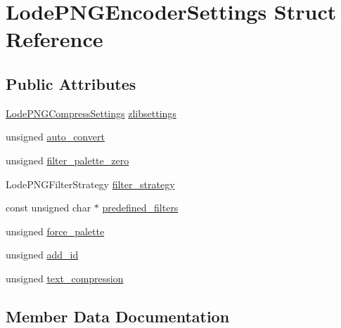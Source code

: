 \hypertarget{struct_lode_p_n_g_encoder_settings}{}\section{Lode\+P\+N\+G\+Encoder\+Settings Struct Reference}
\label{struct_lode_p_n_g_encoder_settings}
\subsection*{Public Attributes}
\begin{DoxyCompactItemize}
\item 
\mbox{\hyperlink{struct_lode_p_n_g_compress_settings}{Lode\+P\+N\+G\+Compress\+Settings}} \mbox{\hyperlink{struct_lode_p_n_g_encoder_settings_a2c5928b4172c75e27de467870f2ff946}{zlibsettings}}
\item 
unsigned \mbox{\hyperlink{struct_lode_p_n_g_encoder_settings_a1203b8db6532c9ff4a5c8ee692cd327a}{auto\+\_\+convert}}
\item 
unsigned \mbox{\hyperlink{struct_lode_p_n_g_encoder_settings_a0d82e8f2fabcb6cebbc54b80922945f1}{filter\+\_\+palette\+\_\+zero}}
\item 
Lode\+P\+N\+G\+Filter\+Strategy \mbox{\hyperlink{struct_lode_p_n_g_encoder_settings_a5e18e4eb941763a2e3e6c65ee9f0729c}{filter\+\_\+strategy}}
\item 
const unsigned char $\ast$ \mbox{\hyperlink{struct_lode_p_n_g_encoder_settings_a4446f87b5283f25664802a1be037e76e}{predefined\+\_\+filters}}
\item 
unsigned \mbox{\hyperlink{struct_lode_p_n_g_encoder_settings_a04dc9622ccd1d7c74c56291409aa512a}{force\+\_\+palette}}
\item 
unsigned \mbox{\hyperlink{struct_lode_p_n_g_encoder_settings_a893aa542aa7c122c32ee36dd716fbcb2}{add\+\_\+id}}
\item 
unsigned \mbox{\hyperlink{struct_lode_p_n_g_encoder_settings_a6ffdcb8e85a65ea208fe027be072d710}{text\+\_\+compression}}
\end{DoxyCompactItemize}


\subsection{Member Data Documentation}
\mbox{\label{struct_lode_p_n_g_encoder_settings_a893aa542aa7c122c32ee36dd716fbcb2}} 
